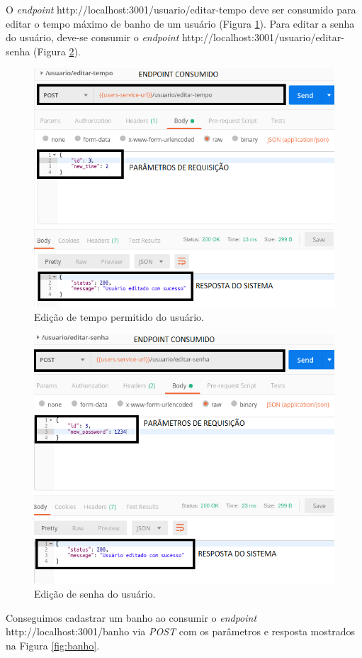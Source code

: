 \clearpage

O \textit{endpoint} http://localhost:3001/usuario/editar-tempo deve ser consumido para editar o tempo máximo de banho de um usuário (Figura \ref{fig:tempo}). Para editar a senha do usuário, deve-se consumir o \textit{endpoint} http://localhost:3001/usuario/editar-senha (Figura \ref{fig:senha}).

\begin{figure}[htbp]
	\centering
	\includegraphics[width=0.7\linewidth]{figuras/postman/time.png}
	\caption{Edição de tempo permitido do usuário.}
	\label{fig:tempo}
\end{figure}

\begin{figure}[htbp]
	\centering
	\includegraphics[width=0.7\linewidth]{figuras/postman/password.png}
	\caption{Edição de senha do usuário.}
	\label{fig:senha}
\end{figure}

Conseguimos cadastrar um banho ao consumir o \textit{endpoint} http://localhost:3001/banho via \textit{POST} com os parâmetros e resposta mostrados na Figura \ref{fig:banho}.

